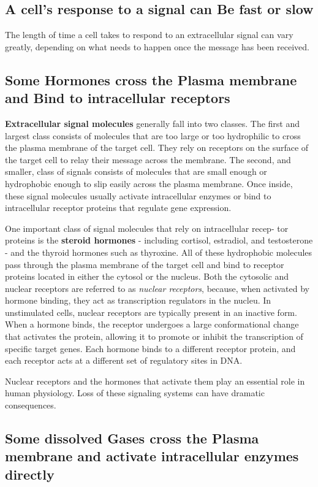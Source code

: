 \subsection{A cell’s response to a signal can Be fast or slow}

The length of time a cell takes to respond to an extracellular signal can
vary greatly, depending on what needs to happen once the message has
been received.

\subsection{Some Hormones cross the Plasma membrane and Bind to intracellular receptors}

\textbf{Extracellular signal molecules} generally fall into two classes. The first
and largest class consists of molecules that are too large or too hydrophilic
to cross the plasma membrane of the target cell. They rely on receptors
on the surface of the target cell to relay their message across the membrane.
The second, and smaller, class of signals consists
of molecules that are small enough or hydrophobic enough to slip easily
across the plasma membrane. Once inside, these signal molecules
usually activate intracellular enzymes or bind to intracellular receptor
proteins that regulate gene expression.

One important class of signal molecules that rely on intracellular recep-
tor proteins is the \textbf{steroid hormones} - including cortisol, estradiol, and
testosterone - and the thyroid hormones such as thyroxine.
All of these hydrophobic molecules pass through the plasma membrane
of the target cell and bind to receptor proteins located in either the cytosol
or the nucleus. Both the cytosolic and nuclear receptors are referred to
as \textit{nuclear receptors}, because, when activated by hormone binding, they
act as transcription regulators in the nucleu. In
unstimulated cells, nuclear receptors are typically present in an inactive
form. When a hormone binds, the receptor undergoes a large conformational
change that activates the protein, allowing it to promote or inhibit
the transcription of specific target genes.
Each hormone binds to a different receptor protein, and each receptor acts
at a different set of regulatory sites in DNA.

Nuclear receptors and the hormones that activate them play an essential
role in human physiology. Loss of these signaling
systems can have dramatic consequences.

\subsection{Some dissolved Gases cross the Plasma membrane and activate intracellular enzymes directly}

